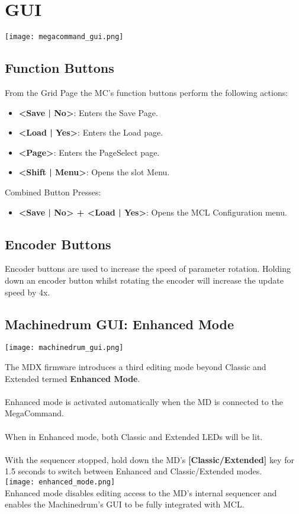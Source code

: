 \chapter{GUI}
\begin{center}
   \texttt{[image: megacommand\_gui.png]}
\end{center}
\section{Function Buttons}
From the Grid Page the MC's function buttons perform the following actions:
\begin{itemize}
\item{\textbf{<Save | No>}: Enters the Save Page.}
\item{\textbf{<Load | Yes>}: Enters the Load page.}
\item{\textbf{<Page>}: Enters the PageSelect page.}
\item{\textbf{<Shift | Menu>}: Opens the slot Menu. }
\end{itemize}
Combined Button Presses:
\begin{itemize}
\item{\textbf{<Save | No> + <Load | Yes>}: Opens the MCL Configuration menu. }
\end{itemize}

\section{Encoder Buttons}
Encoder buttons are used to increase the speed of parameter rotation.
Holding down an encoder button whilst rotating the encoder will increase the update speed by 4x.

\newpage
\section{Machinedrum GUI: Enhanced Mode}
\texttt{[image: machinedrum\_gui.png]}

The MDX firmware introduces a third editing mode beyond Classic and Extended termed \textbf{Enhanced Mode}.\\
\\
Enhanced mode is activated automatically when the MD is connected to the MegaCommand.\\
\\
When in Enhanced mode, both Classic and Extended LEDs will be lit. \\\\With the sequencer stopped, hold down the MD's \textbf{[Classic/Extended]} key for 1.5 seconds to switch between Enhanced and Classic/Extended modes.\\
\texttt{[image: enhanced\_mode.png]}\\
Enhanced mode disables editing access to the MD's internal sequencer and enables the Machinedrum's GUI to be fully integrated with MCL.
\\\\
\newpage
